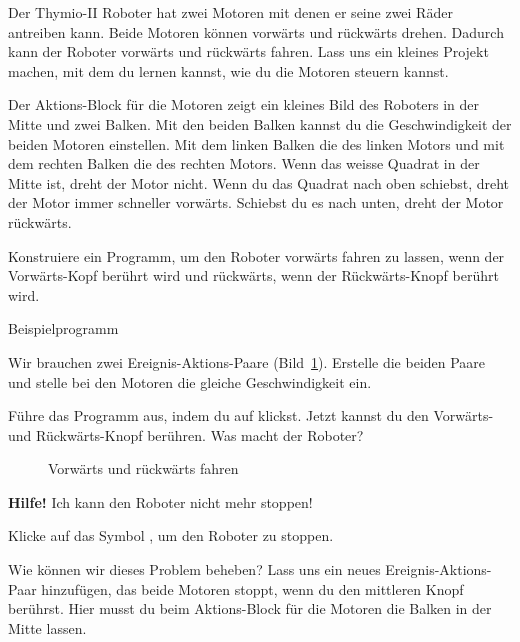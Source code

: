\label{c.moving}


Der Thymio-II Roboter hat zwei Motoren mit denen er seine zwei Räder antreiben
kann. Beide Motoren können vorwärts und rückwärts drehen. Dadurch kann der
Roboter vorwärts und rückwärts fahren. Lass uns ein kleines Projekt machen, mit
dem du lernen kannst, wie du die Motoren steuern kannst.

Der Aktions-Block für die Motoren  zeigt ein kleines Bild
des Roboters in der Mitte und zwei Balken. Mit den beiden Balken kannst du die
Geschwindigkeit der beiden Motoren einstellen. Mit dem linken Balken die des
linken Motors und mit dem rechten Balken die des rechten Motors. Wenn das
weisse Quadrat in der Mitte ist, dreht der Motor nicht. Wenn du das Quadrat
nach oben schiebst, dreht der Motor immer schneller vorwärts. Schiebst du es
nach unten, dreht der Motor rückwärts.

Konstruiere ein Programm, um den Roboter vorwärts fahren zu lassen, wenn der
Vorwärts-Kopf berührt wird und rückwärts, wenn der Rückwärts-Knopf berührt
wird.

{\raggedleft \hfill Beispielprogramm }

Wir brauchen zwei Ereignis-Aktions-Paare (Bild~\ref{fig.nostop}). Erstelle die
beiden Paare und stelle bei den Motoren die gleiche Geschwindigkeit ein.

Führe das Programm aus, indem du auf  klickst. Jetzt kannst du den
Vorwärts- und Rückwärts-Knopf berühren. Was macht der Roboter?

\begin{figure}
\begin{center}
\caption{Vorwärts und rückwärts fahren}\label{fig.nostop}
\end{center}
\end{figure}


\textbf{Hilfe!} Ich kann den Roboter nicht mehr stoppen!

Klicke auf das Symbol , um den Roboter zu stoppen.

Wie können wir dieses Problem beheben? Lass uns ein neues Ereignis-Aktions-Paar
hinzufügen, das beide Motoren stoppt, wenn du den mittleren Knopf berührst.
Hier musst du beim Aktions-Block für die Motoren die Balken in der Mitte
lassen.


